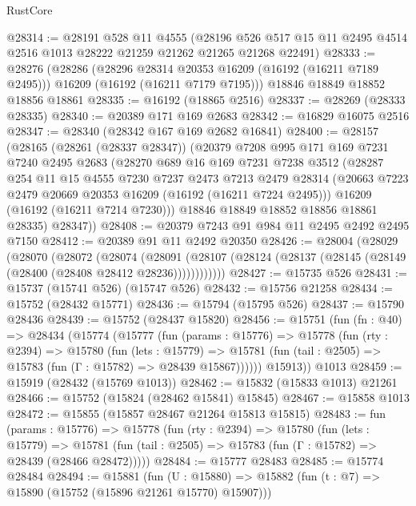 \begin{lexlean}{RustCore}
\begin{coremodule}
@28314 := @28191
    @528
    @11
    @4555
    (@28196 @526 @517 @15 @11 @2495 @4514 @2516 @1013 @28222 @21259 @21262 @21265 @21268 @22491)
@28333 := @28276
    (@28286
      (@28296 @28314 @20353 @16209 (@16192 (@16211 @7189 @2495)))
      @16209
      (@16192 (@16211 @7179 @7195)))
    @18846
    @18849
    @18852
    @18856
    @18861
@28335 := @16192 (@18865 @2516)
@28337 := @28269 (@28333 @28335)
@28340 := @20389 @171 @169 @2683
@28342 := @16829 @16075 @2516
@28347 := @28340 (@28342 @167 @169 @2682 @16841)
@28400 := @28157
    (@28165
      (@28261 (@28337 @28347))
      (@20379
        @7208
        @995
        @171
        @169
        @7231
        @7240
        @2495
        @2683
        (@28270
          @689
          @16
          @169
          @7231
          @7238
          @3512
          (@28287
            @254
            @11
            @15
            @4555
            @7230
            @7237
            @2473
            @7213
            @2479
            @28314
            (@20663 @7223 @2479 @20669 @20353 @16209 (@16192 (@16211 @7224 @2495)))
            @16209
            (@16192 (@16211 @7214 @7230)))
          @18846
          @18849
          @18852
          @18856
          @18861
          @28335)
        @28347))
@28408 := @20379 @7243 @91 @984 @11 @2495 @2492 @2495 @7150
@28412 := @20389 @91 @11 @2492 @20350
@28426 := @28004
    (@28029
      (@28070
        (@28072
          (@28074
            (@28091
              (@28107 (@28124 (@28137 (@28145 (@28149 (@28400 (@28408 @28412 @28236))))))))))))
@28427 := @15735 @526
@28431 := @15737 (@15741 @526) (@15747 @526)
@28432 := @15756 @21258
@28434 := @15752 (@28432 @15771)
@28436 := @15794 (@15795 @526)
@28437 := @15790 @28436
@28439 := @15752 (@28437 @15820)
@28456 := @15751
    (fun (fn : @40) =>
    @28434
      (@15774
        (@15777
          (fun (params : @15776) =>
          @15778
            (fun (rty : @2394) =>
            @15780
              (fun (lets : @15779) =>
              @15781 (fun (tail : @2505) => @15783 (fun (Γ : @15782) => @28439 @15867))))))
        @15913))
    @1013
@28459 := @15919 (@28432 (@15769 @1013))
@28462 := @15832 (@15833 @1013) @21261
@28466 := @15752 (@15824 (@28462 @15841) @15845)
@28467 := @15858 @1013
@28472 := @15855 (@15857 @28467 @21264 @15813 @15815)
@28483 := fun (params : @15776) =>
  @15778
    (fun (rty : @2394) =>
    @15780
      (fun (lets : @15779) =>
      @15781 (fun (tail : @2505) => @15783 (fun (Γ : @15782) => @28439 (@28466 @28472)))))
@28484 := @15777 @28483
@28485 := @15774 @28484
@28494 := @15881
    (fun (U : @15880) => @15882 (fun (t : @7) => @15890 (@15752 (@15896 @21261 @15770) @15907)))

\end{coremodule}
\end{lexlean}
